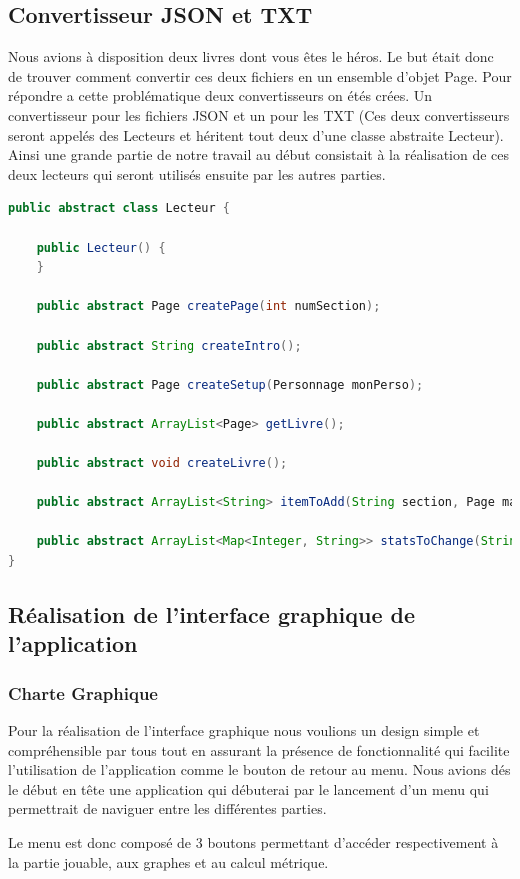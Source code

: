 \documentclass[a4paper,12pt]{article}
\begin{document}
\subsection{Convertisseur JSON et TXT}
Nous avions à disposition deux livres dont vous êtes le héros. Le but était donc de  trouver comment convertir ces deux fichiers en un ensemble d'objet Page. Pour répondre a cette problématique deux convertisseurs on étés crées. Un convertisseur pour les fichiers JSON et un pour les TXT (Ces deux convertisseurs seront appelés des Lecteurs et héritent tout deux d'une classe abstraite Lecteur). Ainsi une grande partie de notre travail au début consistait à la réalisation de ces deux lecteurs qui seront utilisés ensuite par les autres parties. 
\begin{lstlisting}[language=Java , basicstyle=\fontsize{9}{12}\selectfont]
public abstract class Lecteur {

    public Lecteur() {
    }

    public abstract Page createPage(int numSection);

    public abstract String createIntro();

    public abstract Page createSetup(Personnage monPerso);

    public abstract ArrayList<Page> getLivre();

    public abstract void createLivre();

    public abstract ArrayList<String> itemToAdd(String section, Page maPage);

    public abstract ArrayList<Map<Integer, String>> statsToChange(String section, Page maPage);
}
\end{lstlisting}
\subsection{Réalisation de l'interface graphique de l'application}
\subsubsection{Charte Graphique }
Pour la réalisation de l'interface graphique nous voulions un design simple et compréhensible par tous tout en assurant la présence de fonctionnalité qui facilite l'utilisation de l'application comme le bouton de retour au menu. Nous avions dés le début en tête une application qui débuterai par le lancement d'un menu qui permettrait de naviguer entre les différentes parties. 

Le menu est donc composé de 3 boutons permettant d'accéder respectivement à la partie jouable, aux graphes et au calcul métrique. 
\end{document}
